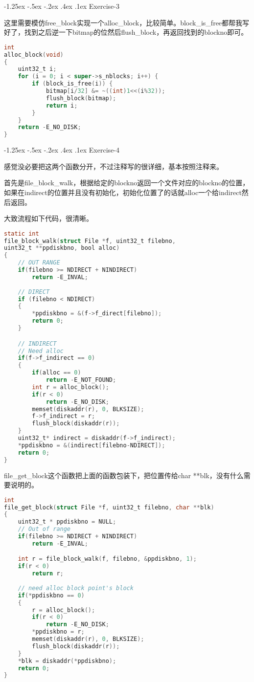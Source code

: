 \documentclass[11pt,a4paper]{article}
\makeatletter
\newcommand{\sihao}{\fontsize{14pt}{\baselineskip}\selectfont}
\renewcommand\subsection{\@startsection{subsection}{1}{\z@}%
{-1.25ex \@plus -.5ex \@minus -.2ex}%
{.4ex \@plus .1ex}%
{\normalfont\sihao\fontspec{黑体}}}
\makeatother
\begin{document}
\subsection{Exercise-3}

这里需要模仿free\_block实现一个alloc\_block，比较简单。block\_is\_free都帮我写好了，找到之后逆一下bitmap的位然后flush\_block，再返回找到的blockno即可。

\setmainfont{Consolas}
\begin{lstlisting}[language={C},firstnumber=1,title=fs/fs.c] 
int
alloc_block(void)
{
	uint32_t i;	
	for (i = 0; i < super->s_nblocks; i++) {
		if (block_is_free(i)) {
			bitmap[i/32] &= ~((int)1<<(i%32));
			flush_block(bitmap);
			return i;
		}
	}
	return -E_NO_DISK;
}
\end{lstlisting}
\setmainfont[BoldFont=黑体]{宋体}

\subsection{Exercise-4}

感觉没必要把这两个函数分开，不过注释写的很详细，基本按照注释来。

首先是file\_block\_walk，根据给定的blockno返回一个文件对应的blockno的位置，如果在indirect的位置并且没有初始化，初始化位置了的话就alloc一个给indirect然后返回。

大致流程如下代码，很清晰。

\setmainfont{Consolas}
\begin{lstlisting}[language={C},firstnumber=1,title=fs/fs.c] 
static int
file_block_walk(struct File *f, uint32_t filebno,
uint32_t **ppdiskbno, bool alloc)
{
	// OUT RANGE 
	if(filebno >= NDIRECT + NINDIRECT)
		return -E_INVAL;
	
	// DIRECT
	if (filebno < NDIRECT)
	{
		*ppdiskbno = &(f->f_direct[filebno]);
		return 0;
	}

	// INDIRECT
	// Need alloc
	if(f->f_indirect == 0)
	{
		if(alloc == 0)
			return -E_NOT_FOUND;
		int r = alloc_block();
		if(r < 0)
			return -E_NO_DISK;
		memset(diskaddr(r), 0, BLKSIZE);
		f->f_indirect = r;
		flush_block(diskaddr(r));
	}
	uint32_t* indirect = diskaddr(f->f_indirect);
	*ppdiskbno = &(indirect[filebno-NDIRECT]);
	return 0;
}
\end{lstlisting}
\setmainfont[BoldFont=黑体]{宋体}

file\_get\_block这个函数把上面的函数包装下，把位置传给char **blk，没有什么需要说明的。

\setmainfont{Consolas}
\begin{lstlisting}[language={C},firstnumber=1,title=fs/fs.c] 
int
file_get_block(struct File *f, uint32_t filebno, char **blk)
{
	uint32_t * ppdiskbno = NULL;
	// Out of range
	if(filebno >= NDIRECT + NINDIRECT)
		return -E_INVAL;

	int r = file_block_walk(f, filebno, &ppdiskbno, 1);
	if(r < 0)
		return r;
	
	// need alloc block point's block
	if(*ppdiskbno == 0)
	{
		r = alloc_block();
		if(r < 0)
			return -E_NO_DISK;
		*ppdiskbno = r;
		memset(diskaddr(r), 0, BLKSIZE);
		flush_block(diskaddr(r));
	}
	*blk = diskaddr(*ppdiskbno);
	return 0;	
}
\end{lstlisting}
\setmainfont[BoldFont=黑体]{宋体}
\end{document}

